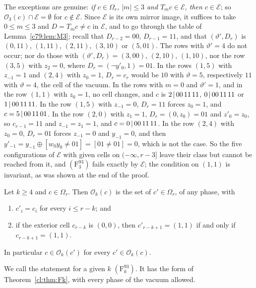 The exceptions are genuine: \emph{if $c\in\Omega_r$, $|m|\le3$ and $T_mc\in\mathcal E$, then $c\in\mathcal E$}; so $\mathcal O_3(c)\cap\mathcal E=\emptyset$ for $c\notin\mathcal E$. Since $\mathcal E$ is its own mirror image, it suffices to take $0\le m\le3$ and $D=T_mc\ne c$ in $\mathcal E$, and to go through the table of Lemma~\ref{c79:lem:M3}; recall that $D_{r-2}=00$, $D_{r-1}=11$, and that $(\vartheta',D_r)$ is $(0,11)$, $(1,11)$, $(2,11)$, $(3,10)$ or $(5,01)$. The rows with $\vartheta'=4$ do not occur; nor do those with $(\vartheta',D_r)=(3,00)$, $(2,10)$, $(1,10)$, nor the row $(3,5)$ with $z_2=0$, where $D_r=(\neg y'_0,1)=01$. In the rows $(1,5)$ with $z_{-1}=1$ and $(2,4)$ with $z_0=1$, $D_r=c_r$ would be $10$ with $\vartheta=5$, respectively $11$ with $\vartheta=4$, the cell of the vacuum. In the rows with $m=0$ and $\vartheta'=1$, and in the row $(1,1)$ with $z_0=1$, no cell changes, and $c$ is $2\,|\,00\,11\,11$, $0\,|\,00\,11\,11$ or $1\,|\,00\,11\,11$. In the row $(1,5)$ with $z_{-1}=0$, $D_r=11$ forces $z_0=1$, and $c=5\,|\,00\,11\,01$. In the row $(2,0)$ with $z_1=1$, $D_r=(0,z_0)=01$ and $z'_0=z_0$, so $c_{r-1}=11$ and $z_{-1}=z_1=1$, and $c=0\,|\,00\,11\,11$. In the row $(2,4)$ with $z_0=0$, $D_r=01$ forces $z_{-1}=0$ and $y_{-1}=0$, and then $y'_{-1}=y_{-1}\oplus[w_0y_0\ne01]=[01\ne01]=0$, which is not the case. So the five configurations of $\mathcal E$ with given cells on $(-\infty,r-3]$ leave their class but cannot be reached from it, and $(\mathrm F^{93}_3)$ fails exactly by $\mathcal E$; the condition on $(1,1)$ is invariant, as was shown at the end of the proof.

\begin{theorem}\label{c79:thm:Fk}
Let $k\ge4$ and $c\in\Omega_r$. Then $\mathcal O_k(c)$ is the set of $c'\in\Omega_r$, of any phase, with
\begin{enumerate}
\item[(i)] $c'_i=c_i$ for every $i\le r-k$; and
\item[(ii)] if the exterior cell $c_{r-k}$ is $(0,0)$, then $c'_{r-k+1}=(1,1)$ if and only if $c_{r-k+1}=(1,1)$.
\end{enumerate}
In particular $c\in\mathcal O_k(c')$ for every $c'\in\mathcal O_k(c)$.
\end{theorem}

We call the statement for a given $k$ $(\mathrm F^{93}_k)$. It has the form of Theorem~\ref{cl:thm:Fk}, with every phase of the vacuum allowed.

